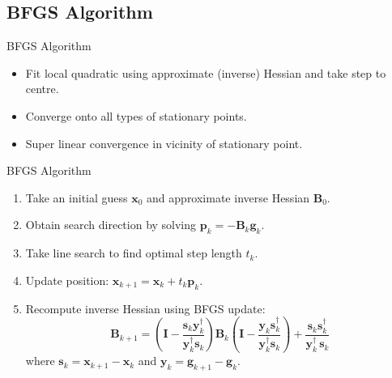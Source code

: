 \documentclass{beamer}
\begin{document}
\subsection{BFGS Algorithm}
\begin{frame}{BFGS Algorithm}
\begin{itemize}
\item Fit local quadratic using \alert{approximate} (inverse) Hessian and take step to centre.
\item Converge onto \alert{all types} of stationary points.
\item Super linear convergence in vicinity of stationary point.
\end{itemize}
\end{frame}

\begin{frame}{BFGS Algorithm}
\begin{enumerate}
  \item<1-> Take an initial guess $\mathbf{x}_0$ and approximate inverse Hessian $\mathbf{B}_0$.
  \item<1-> Obtain search direction by solving $\mathbf{p}_k = - \mathbf{B}_k \mathbf{g}_k.$
  \item<1-> Take line search to find optimal step length $t_k$.
  \item<1-> Update position: $\mathbf{x}_{k+1} = \mathbf{x}_{k} + t_k \mathbf{p}_{k}.$
  \item<1-> Recompute inverse Hessian using BFGS update:
  $$\mathbf{B}_{k+1} =  \left (\mathbf{I}-\frac { \mathbf{s}_k \mathbf{y}_k^{\dagger}} {\mathbf{y}_k^{\dagger} \mathbf{s}_k} \right ) \mathbf{B}_{k} \left (\mathbf{I}-\frac { \mathbf{y}_k \mathbf{s}_k^{\dagger}} {\mathbf{y}_k^{\dagger} \mathbf{s}_k} \right )+\frac
{\mathbf{s}_k \mathbf{s}_k^{\dagger}} {\mathbf{y}_k^{\dagger} \, \mathbf{s}_k}$$
where $\mathbf{s}_k = \mathbf{x}_{k+1} - \mathbf{x}_{k}$ and $\mathbf{y}_k = \mathbf{g}_{k+1} - \mathbf{g}_{k}.$
\end{enumerate}
\end{frame}
\end{document}
